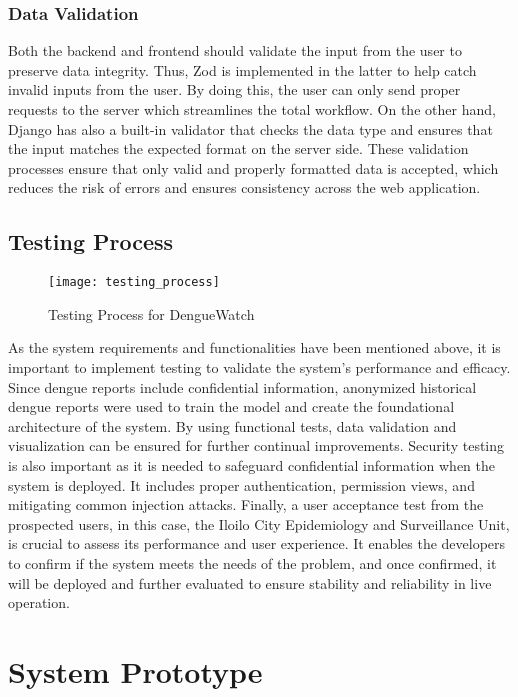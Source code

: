 \subsubsection{Data Validation}
Both the backend and frontend should validate the input from the user to preserve data integrity. Thus, Zod is implemented in the latter to help catch invalid inputs from the user. By doing this, the user can only send proper requests to the server which streamlines the total workflow. On the other hand, Django has also a built-in validator that checks the data type and ensures that the input matches the expected format on the server side. These validation processes ensure that only valid and properly formatted data is accepted, which reduces the risk of errors and ensures consistency across the web application. 

\subsection{Testing Process}
\begin{figure}[H]
	\centering
	\texttt{[image: testing\_process]}
	\caption{Testing Process for DengueWatch}
	\label{fig:testing-process}
\end{figure}

As the system requirements and functionalities have been mentioned above, it is important to implement testing to validate the system's performance and efficacy. Since dengue reports include confidential information, anonymized historical dengue reports were used to train the model and create the foundational architecture of the system. By using functional tests, data validation and visualization can be ensured for further continual improvements. Security testing is also important as it is needed to safeguard confidential information when the system is deployed. It includes proper authentication, permission views, and mitigating common injection attacks. Finally, a user acceptance test from the prospected users, in this case, the Iloilo City Epidemiology and Surveillance Unit, is crucial to assess its performance and user experience. It enables the developers to confirm if the system meets the needs of the problem, and once confirmed, it will be deployed and further evaluated to ensure stability and reliability in live operation. 

\section{System Prototype}
